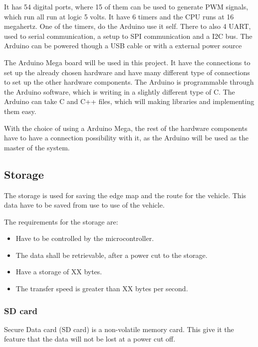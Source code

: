 It has 54 digital ports, where 15 of them can be used to generate PWM signals, which run all run at logic 5 volts. It have 6 timers and the CPU runs at 16 megahertz. One of the timers, do the Arduino use it self. There to also 4 UART, used to serial communication, a setup to SPI communication and a I2C bus. The Arduino can be powered though a USB cable or with a external power source

The Arduino Mega board will be used in this project. It have the connections to set up the already chosen hardware and have many different type of connections to set up the other hardware components. The Arduino is programmable through the Arduino software, which is writing in a slightly different type of C. The Arduino can take C and C++ files, which will making libraries and implementing them easy. 


With the choice of using a Arduino Mega, the rest of the hardware components have to have a connection possibility with it, as the Arduino will be used as the master of the system. 



\subsection{Storage}
The storage is used for saving the edge map and the route for the vehicle. This data have to be saved from use to use of the vehicle. 

The requirements for the storage are:
\begin{itemize}
\item Have to be controlled by the microcontroller.
\item The data shall be retrievable, after a power cut to the storage.
\item Have a storage of XX bytes. 
\item The transfer speed is greater than XX bytes per second. 
\end{itemize}

\subsubsection{SD card} \label{SDcard}
Secure Data card (SD card) is a non-volatile memory card. This give it the feature that the data will not be lost at a power cut off. 


